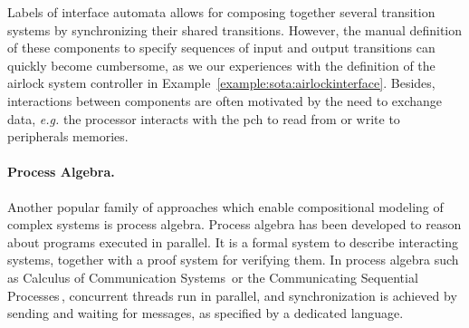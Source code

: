 \begin{example}
\begin{center}
  \end{center}
\end{example}

Labels of interface automata allows for composing together several transition
systems by synchronizing their shared transitions.
%
However, the manual definition of these components to specify sequences of input
and output transitions can quickly become cumbersome, as we our experiences with
the definition of the airlock system controller in
Example~\ref{example:sota:airlockinterface}.
%
Besides, interactions between components are often motivated by the need to
exchange data, \emph{e.g.} the processor interacts with the \ac{pch} to read
from or write to peripherals memories.

\paragraph{Process Algebra.}
%
Another popular family of approaches which enable compositional modeling of
complex systems is process algebra.
%
Process algebra has been developed to reason about programs executed in
parallel.
%
It is a formal system to describe interacting systems, together with a proof
system for verifying them.
%
In process algebra such as Calculus of Communication
Systems\,\cite{milner1980ccs} or the Communicating Sequential
Processes\,\cite{hoare1978csp}, concurrent threads run in parallel, and
synchronization is achieved by sending and waiting for messages, as specified by
a dedicated language.


